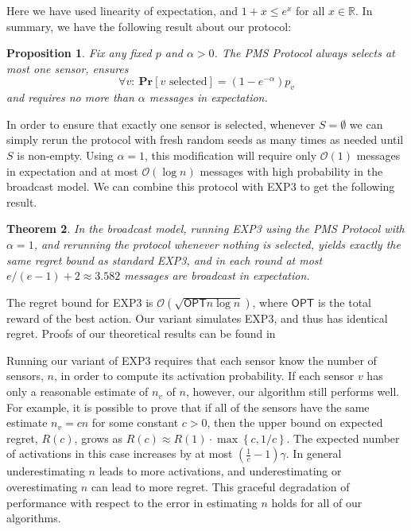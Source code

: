 \documentclass{sig-alternate-dan}
\numberwithin{equation}{section}
\newcommand{\algofont}[1]{\textsc{#1}}
\newcommand{\cO}{\mathcal{O}}
\newcommand{\EXPthree}{{\algofont{EXP3}}\xspace}
\newcommand{\numsensors}{\ensuremath{n}}
\newcommand{\sensor}{\ensuremath{v}}
\newcommand{\OPT}{\textsf{OPT}}
\newcommand{\LimitProtocolShort}[0]{PMS Protocol\xspace}
\newcommand{\Real}{\mathbb R}
\newcommand{\paren} [1] {\ensuremath{ \left( {#1} \right) }}
\newcommand{\set}[1]{\ensuremath{\left\{#1\right\}}}
\newcommand{\prob}[1]{\ensuremath{\mathbf{Pr}\left[#1\right] }}
\renewcommand{\paragraph}[1]{\vspace{3mm}\noindent{\bf #1.} }
\newtheorem{theorem}{Theorem}
\newtheorem{prop}[theorem]{Proposition}
\begin{document}
Here we have used linearity of expectation, and $1+x
\le e^x$ for all $x \in \Real$.
In summary, we have the following result about our protocol:
\begin{prop} \label{thm:sampling}
Fix any fixed  $p$ and $\alpha>0$.  The \LimitProtocolShort always selects at most
one sensor, ensures   
%
%
%
$$\forall \sensor:\ \prob{\sensor \text{ selected}} = (1 - e^{-\alpha})p_{\sensor}$$
and requires no more than $\alpha$ messages in expectation. 
\end{prop}

%
%
%
%

In order to ensure that exactly one sensor is selected, whenever $S =
\emptyset$ we can simply rerun the protocol with fresh random seeds as
many times as needed until $S$ is non-empty.  Using $\alpha = 1$, 
this modification will require only $\cO(1)$ messages in expectation and
at most $\cO(\log n)$ messages with high probability in the broadcast model.
We can combine this protocol with \EXPthree to get the following
result.
%
%
%

\begin{theorem} \label{thm:distributed-single-sensor-selection}
%
%
%
%
%
%
%
%
In the broadcast model, running \EXPthree using the \LimitProtocolShort with
$\alpha = 1$, and rerunning the protocol whenever nothing is selected,
yields exactly the same regret bound as standard \EXPthree, and
 in each round at most $e/(e-1)+2 \approx 3.582$ messages
are broadcast in expectation.
%
%
%
\end{theorem}

The regret bound for \EXPthree is $\cO(\sqrt{\OPT \numsensors \log \numsensors})$, where
$\OPT$ is the total reward of the best action.  
Our variant simulates \EXPthree, and thus has identical regret.
%
%
Proofs of our theoretical results can be found in
%

\paragraph{Remark} Running our variant of \EXPthree requires that
each sensor know the number of sensors, $n$, in order to compute its
activation probability.  If each sensor $\sensor$ has only a reasonable
estimate of $n_{\sensor}$ of $n$, however, our algorithm still
performs well.  
For example, it is possible to prove that if all of the sensors have
the same estimate $n_{\sensor} = cn$ for some constant $c > 0$, 
then the upper bound on expected 
regret, $R(c)$, grows as $R(c) \approx  R(1)\cdot \max \set{c,
  1/c}$.
%
%
%
The expected number of activations in this
case increases by at most $\paren{\frac{1}{c} - 1}\gamma$.
In general underestimating $n$ leads to more activations, and
underestimating or overestimating $n$ can lead to more regret.
This graceful degradation of performance with respect to the error
in estimating $n$ holds for all of our algorithms.
\end{document}
